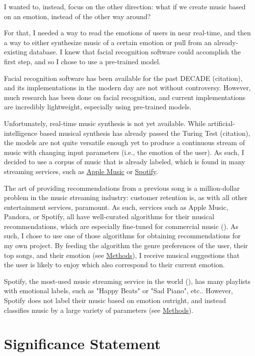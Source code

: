 \documentclass{article}
\renewcommand{\_}[1]{\underline{ #1 }}
\theoremstyle{definition}
\begin{document}
I wanted to, instead, focus on the other direction: what if we create music based on an emotion, instead of the other way around?

For that, I needed a way to read the emotions of users in near real-time, and then a way to either synthesize music of a certain emotion or pull from an already-existing database. I knew that facial recognition software could accomplish the first step, and so I chose to use a pre-trained model.

Facial recognition software has been available for the past DECADE (citation), and its implementations in the modern day are not without controversy. However, much research has been done on facial recognition, and current implementations are incredibly lightweight, especially using pre-trained models. 

Unfortunately, real-time music synthesis is not yet available. While artificial-intelligence based musical synthesis has already passed the Turing Test (citation), the models are not quite versatile enough yet to produce a continuous stream of music with changing input parameters (i.e., the emotion of the user). As such, I decided to use a corpus of music that is already labeled, which is found in many streaming services, such as \href{https://www.apple.com/apple-music/}{Apple Music} or \href{https://www.spotify.com/us/}{Spotify}.

The art of providing recommendations from a previous song is a million-dollar problem in the music streaming industry: customer retention is, as with all other entertainment services, paramount. As such, services such as Apple Music, Pandora, or Spotify, all have well-curated algorithms for their musical recommendations, which are especially fine-tuned for commercial music (\cite{drott2018}). As such, I chose to use one of those algorithms for obtaining recommendations for my own project. By feeding the algorithm the genre preferences of the user, their top songs, and their emotion (see \hyperref[Methods]{Methods}), I receive musical suggestions that the user is likely to enjoy which also correspond to their current emotion.

Spotify, the most-used music streaming service in the world (\cite{mulligan2022}), has many playlists with emotional labels, such as "Happy Beats" or "Sad Piano", etc.. However, Spotify does not label their music based on emotion outright, and instead classifies music by a large variety of parameters (see \hyperref[Methods]{Methods}). 

\section[Significance Statement]{Significance Statement}
\end{document}
